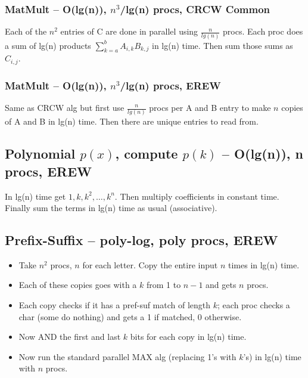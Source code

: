 \documentclass[12pt]{article}
\providecommand{\tightlist}{
    \setlength{\itemsep}{0pt}\setlength{\parskip}{0pt}
}
\begin{document}
\subsubsection{MatMult -- O(lg(n)), $n^3$/lg(n) procs, CRCW Common}
Each of the $n^2$ entries of C are done in parallel using $\frac{n}{lg(n)}$ procs.
Each proc does a sum of lg(n) products $\sum_{k=a}^b A_{i,k}B_{k,j}$ in lg(n) time.
Then sum those sums as $C_{i,j}$.
\subsubsection{MatMult -- O(lg(n)), $n^3$/lg(n) procs, EREW}
Same as CRCW alg but first use $\frac{n}{lg(n)}$ procs per A and B entry to make $n$ copies of A and B in lg(n) time.
Then there are unique entries to read from.



\subsection{Polynomial $p(x)$, compute $p(k)$ -- O(lg(n)), n procs, EREW}
In lg(n) time get $1,k,k^2,\dots ,k^n$. Then multiply coefficients in constant time.
Finally sum the terms in lg(n) time as usual (associative).


\subsection{Prefix-Suffix -- poly-log, poly procs, EREW}
\begin{itemize}\tightlist
  \item Take $n^2$ procs, $n$ for each letter. Copy the entire input $n$ times in lg(n) time.
  \item Each of these copies goes with a $k$ from 1 to $n-1$ and gets $n$ procs.
  \item Each copy checks if it has a pref-suf match of length $k$; each proc checks a char (some do nothing) and gets a 1 if matched, 0 otherwise.
  \item Now AND the first and last $k$ bits for each copy in lg(n) time.
  \item Now run the standard parallel MAX alg (replacing 1's with $k$'s) in lg(n) time with $n$ procs.
\end{itemize}
\end{document}
